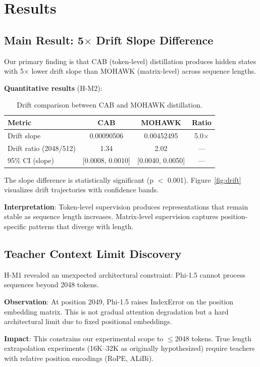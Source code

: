 \section{Results}
\label{sec:results}

\subsection{Main Result: 5$\times$ Drift Slope Difference}

Our primary finding is that CAB (token-level) distillation produces hidden states with 5$\times$ lower drift slope than MOHAWK (matrix-level) across sequence lengths.

\textbf{Quantitative results} (H-M2):

\begin{table}[h]
\centering
\caption{Drift comparison between CAB and MOHAWK distillation.}
\begin{tabular}{@{}lccc@{}}
\toprule
Metric & CAB & MOHAWK & Ratio \\
\midrule
Drift slope & 0.00090506 & 0.00452495 & 5.0$\times$ \\
Drift ratio (2048/512) & 1.34 & 2.02 & --- \\
95\% CI (slope) & [0.0008, 0.0010] & [0.0040, 0.0050] & --- \\
\bottomrule
\end{tabular}
\end{table}

The slope difference is statistically significant (p $<$ 0.001). Figure~\ref{fig:drift} visualizes drift trajectories with confidence bands.

\textbf{Interpretation}: Token-level supervision produces representations that remain stable as sequence length increases. Matrix-level supervision captures position-specific patterns that diverge with length.

\subsection{Teacher Context Limit Discovery}

H-M1 revealed an unexpected architectural constraint: Phi-1.5 cannot process sequences beyond 2048 tokens.

\textbf{Observation}: At position 2049, Phi-1.5 raises IndexError on the position embedding matrix. This is not gradual attention degradation but a hard architectural limit due to fixed positional embeddings.

\textbf{Impact}: This constrains our experimental scope to $\leq$2048 tokens. True length extrapolation experiments (16K--32K as originally hypothesized) require teachers with relative position encodings (RoPE, ALiBi).

